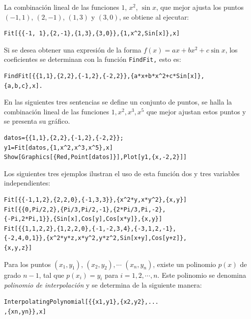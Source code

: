       La combinación lineal de las funciones $1$, $x^2$, $\sin x$,
      que mejor ajusta los puntos  $(-1, 1)$, $(2,-1)$, $(1,3)$ y $(3,0)$,
      se obtiene al ejecutar:
      \begin{tcolorbox}
\begin{Verbatim}[formatcom=\letraverbatim]
Fit[{{-1, 1},{2,-1},{1,3},{3,0}},{1,x^2,Sin[x]},x]
\end{Verbatim}
      \end{tcolorbox}
      Si se desea obtener una expresión de la forma $f(x)=ax+bx^2+c \sin x$,
      los coeficientes se determinan con la función \verb"FindFit," esto es:
      \begin{tcolorbox}
\begin{Verbatim}[formatcom=\letraverbatim]
FindFit[{{1,1},{2,2},{-1,2},{-2,2}},{a*x+b*x^2+c*Sin[x]},
{a,b,c},x].
\end{Verbatim}
      \end{tcolorbox}
      En las siguientes tres sentencias se define un conjunto de puntos, se halla la
      combinación lineal de las funciones $1,x^{2},x^{3},x^{5}$ que mejor
      ajustan estos puntos y se presenta su gráfico.
      \begin{tcolorbox}
\begin{Verbatim}[formatcom=\letraverbatim]
datos={{1,1},{2,2},{-1,2},{-2,2}};
y1=Fit[datos,{1,x^2,x^3,x^5},x]
Show[Graphics[{Red,Point[datos]}],Plot[y1,{x,-2,2}]]
\end{Verbatim}
      \end{tcolorbox}
      Los siguientes tres ejemplos ilustran el uso de esta función dos y tres
      variables independientes:

      \begin{tcolorbox}[title=Instrucciones en Mathematica]
\begin{Verbatim}[formatcom=\letraverbatim]
Fit[{{-1,1,2},{2,2,0},{-1,3,3}},{x^2*y,x*y^2},{x,y}]
Fit[{{0,Pi/2,2},{Pi/3,Pi/2,-1},{2*Pi/3,Pi,-2},
{-Pi,2*Pi,1}},{Sin[x],Cos[y],Cos[x*y]},{x,y}]
Fit[{{1,1,2,2},{1,2,2,0},{-1,-2,3,4},{-3,1,2,-1},
{-2,4,0,1}},{x^2*y*z,x*y^2,y*z^2,Sin[x+y],Cos[y+z]},
{x,y,z}]
\end{Verbatim}
      \end{tcolorbox}

      Para los puntos $(x_1,y_1)$, $(x_2,y_2),\cdots$ $(x_n,y_n)$, existe un polinomio $p(x)$
      de grado $n-1$, tal que $p(x_i)=y_i$ para $i=1,2,\cdots,n$.
      Este polinomio se denomina \emph{polinomio de interpolación} y se determina
      de la siguiente manera:
      \begin{tcolorbox}[title=Polinomio de interpolación]
\begin{Verbatim}
InterpolatingPolynomial[{{x1,y1},{x2,y2},...
,{xn,yn}},x]
\end{Verbatim}
      \end{tcolorbox}

